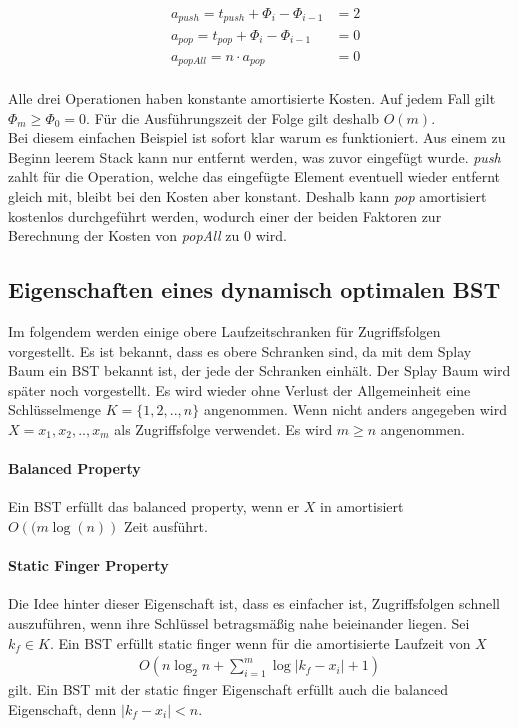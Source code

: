 \documentclass[a4paper,12pt]{article}
\begin{document}
\begin{align*}   
&a_{\mathit{push}} = t_{\mathit{push}} + \Phi_{i} - \Phi_{i-1}  &= 2\\
&a_{\mathit{pop}} = t_{\mathit{pop}} + \Phi_{i} - \Phi_{i-1}  &= 0\\
&a_{\mathit{popAll}} = n \cdot a_{\mathit{pop}} &= 0
\end{align*}\\
Alle drei Operationen haben konstante amortisierte Kosten. Auf jedem Fall gilt $ \Phi_m \geq  \Phi_0 = 0 $. Für die Ausführungszeit der Folge gilt deshalb $O(m)$. \\
Bei diesem einfachen Beispiel ist sofort klar warum es funktioniert. Aus einem zu Beginn leerem Stack kann nur entfernt werden, was zuvor eingefügt wurde. \textit{push} zahlt für die Operation, welche das eingefügte Element eventuell wieder entfernt gleich mit, bleibt bei den Kosten aber konstant. Deshalb kann \textit{pop} amortisiert kostenlos durchgeführt werden, wodurch einer der beiden Faktoren zur Berechnung der Kosten von \textit{popAll} zu $0$ wird. 



\subsection{Eigenschaften eines dynamisch optimalen BST }\label{upperBounds}
Im folgendem werden einige obere Laufzeitschranken für Zugriffsfolgen vorgestellt. Es ist bekannt, dass es obere Schranken sind, da mit dem Splay Baum ein BST bekannt ist, der jede der Schranken einhält. Der Splay Baum wird später noch vorgestellt. Es wird wieder ohne Verlust der Allgemeinheit eine Schlüsselmenge $K = \{1,2,..,n\}$ angenommen. Wenn nicht anders angegeben wird  $X = x_1,x_2,..,x_m$ als Zugriffsfolge verwendet. Es wird $m \geq n$ angenommen.


\paragraph{Balanced Property}
Ein BST erfüllt das balanced property, wenn er $X$ in amortisiert $O\left((m \log \left(n \right)\right)$ Zeit ausführt. 

\paragraph{Static Finger Property}
Die Idee hinter dieser Eigenschaft ist, dass es einfacher ist, Zugriffsfolgen schnell auszuführen, wenn ihre Schlüssel betragsmäßig nahe beieinander liegen. 
Sei $k_f \in K$. Ein BST erfüllt static finger wenn für die amortisierte Laufzeit von $X$ 
\begin{align*}
O\left(n \log_2 n + \sum_{i = 1}^{m} \log \vert k_f - x_i  \vert	+ 1	\right)
\end{align*}
gilt. Ein BST mit der static finger Eigenschaft erfüllt auch die balanced Eigenschaft, denn $ \vert k_f - x_i  \vert < n$.
\end{document}
